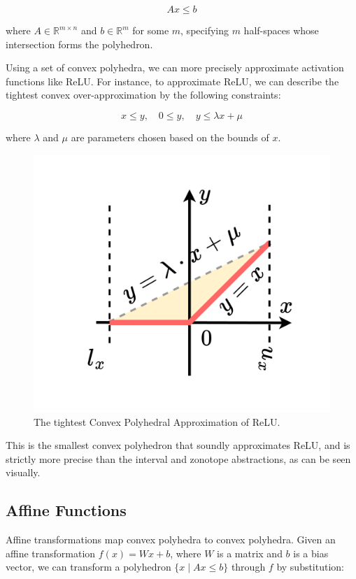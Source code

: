 \documentclass[oneside,11pt,dvipsnames]{book}
\numberwithin{equation}{section}
\theoremstyle{definition}
\theoremstyle{remark}
\begin{document}
\[
Ax \leq b
\]

where \(A \in \mathbb{R}^{m \times n}\) and \(b \in \mathbb{R}^m\) for some \(m\), specifying \(m\) half-spaces whose intersection forms the polyhedron.

Using a set of convex polyhedra, we can more precisely approximate activation functions like ReLU. For instance, to approximate ReLU, we can describe the tightest convex over-approximation by the following constraints:

\[
x \leq y, \quad 0 \leq y, \quad y \leq \lambda x + \mu
\]

where \(\lambda\) and \(\mu\) are parameters chosen based on the bounds of \(x\).

\begin{figure}[h]
    \centering
    \includegraphics[width=0.5\linewidth]{figure/3-lines-polytope.png}
    \caption{The tightest Convex Polyhedral Approximation of ReLU.}
    \label{fig:enter-label}
\end{figure}

This is the smallest convex polyhedron that soundly approximates ReLU, and is strictly more precise than the interval and zonotope abstractions, as can be seen visually.

\subsection{Affine Functions}

Affine transformations map convex polyhedra to convex polyhedra.  
Given an affine transformation \(f(x) = Wx + b\), where \(W\) is a matrix and \(b\) is a bias vector, we can transform a polyhedron \(\{x \mid A x \leq b\}\) through \(f\) by substitution:
\end{document}
